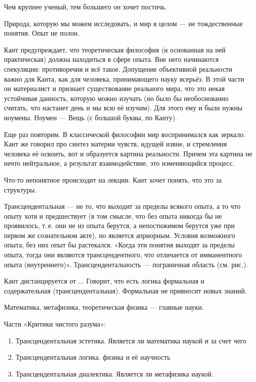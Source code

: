 Чем крупнее ученый, тем большего он хочет постичь.


Природа, которую мы можем исследовать, и мир в целом --- не тождественные понятия. Опыт не полон.

Кант предупреждает, что теоретическая философия (и основанная на ней практическая) должна находиться в сфере опыта. Вне него начинаются спекуляции: противоречия и всё такое.
Допущение объективной реальности важно для Канта, как для человека, принимающего науку всерьёз. В этой части он материалист и признает существование реального мира, 
что это некая устойчивая данность, которую можно изучать (но было бы необоснованно считать, что настанет день и мы всю её изучим). Для этого ему и были нужны ноумены. Ноумен --- Вещь (с большой буквы, по Канту).

Еще раз повторим. В классической философии мир воспринимался как зеркало. Кант же говорил про синтез материи чувств, идущей извне, и стремления человека её освоить, вот и образуется картина реальности. 
Причем эта картина не нечто нейтральное, а результат взаимодействие, это изменяющийся процесс.

Что-то непонятное происходит на лекции.
Кант хочет понять, что это за структуры. 

Трансцендентальная --- не то, что выходит за пределы всякого опыта, а то что опыту хотя и предшествует (в том смысле, что без опыта никогда бы не проявилось, 
т.\,е. они не из опыта берутся, а непостижимом берутся уже при первом же сознательном акте), но является априорным.
Условия возможного опыта, без них опыт бы растекался. «Когда эти понятия выходят за пределы опыта, тогда они являются трансцендентного, что отличается от имманентного опыта (внутреннего)». Трансцендентальность --- пограничная область (см. рис.). 

Кант дистанцируется от ... Говорит, что есть логика формальная и содержательная (трансцендентальная). Формальная не привносит новых знаний.

Математика, метафизика, теоретическая физика --- главные науки.

Части «Критики чистого разума»:
\begin{enumerate}
	\item Трансцендентальная эстетика. Является ли математика наукой и за счет чего
	\item Трансцендентальная логика. физика и её научность
	\item Трансцендентальная диалектика. Является ли метафизика наукой.
\end{enumerate}

